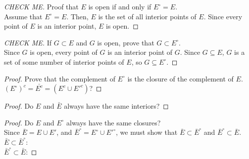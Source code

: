 \documentclass[10pt]{article}
\theoremstyle{definition}
\theoremstyle{plain}
\begin{document}
\begin{proof}[CHECK ME]
Proof that $E$ is open if and only if $E^\circ = E$. \\

Assume that $E^\circ =E$. Then, $E$ is the set of all interior points of $E$. Since every point of $E$ is an interior point, $E$ is open.
\end{proof}

\begin{proof}[CHECK ME]
If $G \subset E$ and $G$ is open, prove that $G\subset E^\circ$. \\

Since $G$ is open, every point of $G$ is an interior point of $G$. Since $G\subseteq E$, $G$ is a set of some number of interior points of $E$, so $G\subseteq E^\circ$.
\end{proof}

\begin{proof}
Prove that the complement of $E^\circ$ is the closure of the complement of $E$. \\

$(E^\circ)^c = \bar{E^c} = (E^c \cup E'^c)$?
\end{proof}

\begin{proof}
Do $E$ and $\bar{E}$ always have the same interiors?
\end{proof}

\begin{proof}
Do $E$ and $E^\circ$ always have the same closures? \\

Since $\bar{E} = E\cup E'$, and $\bar{E}^\circ = E^\circ \cup E'^\circ$, we must show that $\bar{E} \subset \bar{E}^\circ$ and $\bar{E}^\circ \subset \bar{E}$. \\

$\bar{E} \subset \bar{E}^\circ$: \\

$\bar{E}^\circ \subset \bar{E}$:
\end{proof}
\end{document}
